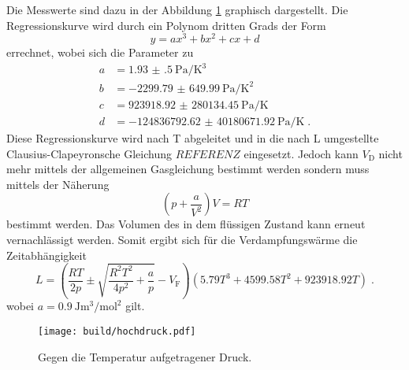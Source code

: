Die Messwerte sind dazu in der Abbildung \ref{fig:hochdruck} graphisch dargestellt.
Die Regressionskurve wird durch ein Polynom dritten Grads der Form 
\begin{equation*}
    y = ax^3+bx^2+cx+d    
\end{equation*}
errechnet, wobei sich die Parameter zu
\begin{align*}
    a &= \SI{1.93(50)}{\pascal\per\kelvin\tothe{3}}                 \\
    b &= \SI{-2299.79(64999)}{\pascal\per\kelvin\tothe{2}}          \\
    c &= \SI{923918.92(28013445)}{\pascal\per\kelvin}     \\
    d &= \SI{-124836792.62(4018067192)}{\pascal\per\kelvin} \; \text{.}
\end{align*}
Diese Regressionskurve wird nach T abgeleitet und in die nach L umgestellte Clausius-Clapeyronsche Gleichung $REFERENZ$ eingesetzt.
Jedoch kann $V_\text{D}$ nicht mehr mittels der allgemeinen Gasgleichung bestimmt werden sondern muss mittels der Näherung
\begin{equation*}
    \left( p + \frac{a}{V^2}\right) V = RT
\end{equation*}
bestimmt werden.
Das Volumen des in dem flüssigen Zustand kann erneut vernachlässigt werden.
Somit ergibt sich für die Verdampfungswärme die Zeitabhängigkeit
\begin{equation*}
    L = \left( \frac{RT}{2p} \pm \sqrt{\frac{R^2T^2}{4p^2} + \frac{a}{p}}- V_\text{F}\right)\left( 5.79 T^3 + 4599.58 T^2 + 923918.92T \right) \; \text{.}
\end{equation*} 
wobei $a = \SI{0.9}{\joule\metre\tothe{3}\per\mole\squared}$ gilt.
\begin{figure}
    \centering
    \caption{Gegen die Temperatur aufgetragener Druck.}
    \label{fig:hochdruck}
    \texttt{[image: build/hochdruck.pdf]}
\end{figure}
